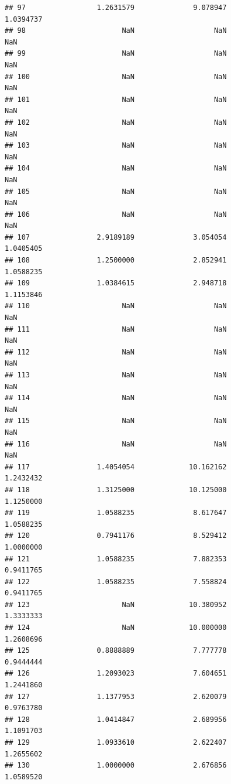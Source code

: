 \documentclass[]{article}
\begin{document}
\begin{verbatim}
## 97                 1.2631579              9.078947               1.0394737
## 98                       NaN                   NaN                     NaN
## 99                       NaN                   NaN                     NaN
## 100                      NaN                   NaN                     NaN
## 101                      NaN                   NaN                     NaN
## 102                      NaN                   NaN                     NaN
## 103                      NaN                   NaN                     NaN
## 104                      NaN                   NaN                     NaN
## 105                      NaN                   NaN                     NaN
## 106                      NaN                   NaN                     NaN
## 107                2.9189189              3.054054               1.0405405
## 108                1.2500000              2.852941               1.0588235
## 109                1.0384615              2.948718               1.1153846
## 110                      NaN                   NaN                     NaN
## 111                      NaN                   NaN                     NaN
## 112                      NaN                   NaN                     NaN
## 113                      NaN                   NaN                     NaN
## 114                      NaN                   NaN                     NaN
## 115                      NaN                   NaN                     NaN
## 116                      NaN                   NaN                     NaN
## 117                1.4054054             10.162162               1.2432432
## 118                1.3125000             10.125000               1.1250000
## 119                1.0588235              8.617647               1.0588235
## 120                0.7941176              8.529412               1.0000000
## 121                1.0588235              7.882353               0.9411765
## 122                1.0588235              7.558824               0.9411765
## 123                      NaN             10.380952               1.3333333
## 124                      NaN             10.000000               1.2608696
## 125                0.8888889              7.777778               0.9444444
## 126                1.2093023              7.604651               1.2441860
## 127                1.1377953              2.620079               0.9763780
## 128                1.0414847              2.689956               1.1091703
## 129                1.0933610              2.622407               1.2655602
## 130                1.0000000              2.676856               1.0589520

\end{verbatim}
\end{document}
